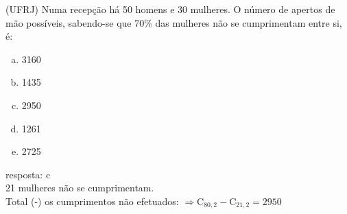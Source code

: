 \begin{ex}
 (UFRJ) Numa recepção há 50 homens e 30 mulheres. O número de apertos de mão possíveis, sabendo-se que 70\% das mulheres não se cumprimentam entre si, é:
    \begin{enumerate}[(a)]
    \item 3160
    \item 1435
    \item 2950
    \item 1261
    \item 2725
    \end{enumerate}
      \begin{sol}
       resposta: c \\
        21 mulheres não se cumprimentam.\\
       Total (-) os cumprimentos não efetuados: 
       $\Longrightarrow\mathrm{C}_{{80},2}-\mathrm{C}_{{21},2}=2950$
      \end{sol}
\end{ex}
